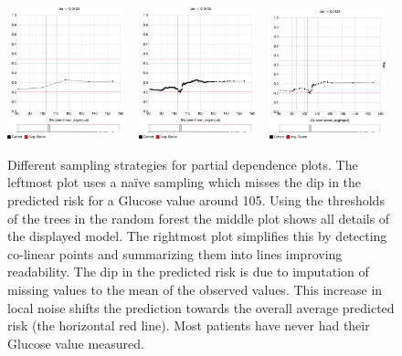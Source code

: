 \begin{figure}[t]
\centering
\includegraphics[width=0.3\textwidth]{prospector/sampling_1} %
~
\includegraphics[width=0.3\textwidth]{prospector/sampling_2} %
~
\includegraphics[width=0.3\textwidth]{prospector/sampling_3} %
\caption[Different sampling strategies for partial dependence plots.]{
Different sampling strategies for partial dependence plots.
The leftmost plot uses a na\"ive sampling which misses the
dip in the predicted risk for a Glucose value around 105.
Using the thresholds of the trees in the random forest
the middle plot shows all details of the displayed model.
The rightmost plot simplifies this by detecting co-linear points
and summarizing them into lines improving readability.
The dip in the predicted risk is due to imputation of missing values
to the mean of the observed values.
This increase in local noise shifts the prediction towards the overall
average predicted risk (the horizontal red line).
Most patients have never had their Glucose value measured.
}
\label{figs:sampling}
\end{figure}